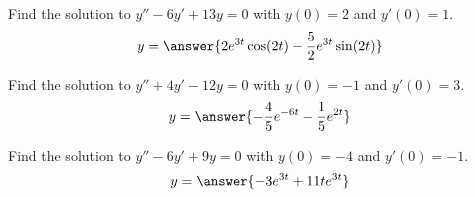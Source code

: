 \documentclass{ximera}
\begin{document}
\begin{exercise}
    Find the solution to $y'' - 6y' + 13y = 0$ with $y(0) = 2$ and $y'(0) = 1$. 
    \[
        y = \answer{2e^{3t}\cos(2t) - \frac{5}{2}e^{3t}\sin(2t)}
    \]
\end{exercise}

\begin{exercise}
    Find the solution to $y'' + 4y' - 12y = 0$ with $y(0) = -1$ and $y'(0) = 3$. 
    \[
        y = \answer{-\frac{4}{5}e^{-6t} - \frac{1}{5}e^{2t}}
    \]
\end{exercise}

\begin{exercise}
    Find the solution to $y'' - 6y' + 9y = 0$ with $y(0) = -4$ and $y'(0) = -1$. 
    \[
        y = \answer{-3e^{3t} + 11te^{3t}}
    \]
\end{exercise}
\end{document}
